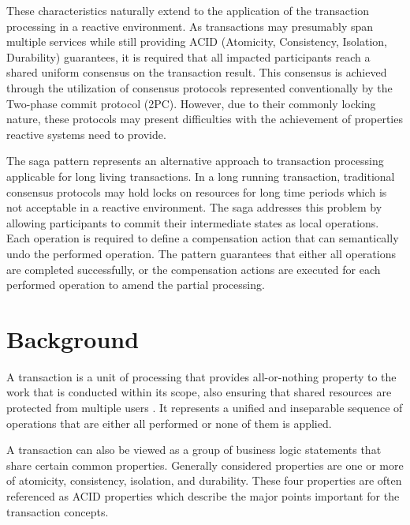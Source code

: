 \documentclass[5p]{elsarticle}
\begin{document}
These characteristics naturally extend to the application of the transaction processing in a reactive environment. As transactions may presumably span multiple services while still providing ACID (Atomicity, Consistency, Isolation, Durability) guarantees, it is required that all impacted participants reach a shared uniform consensus on the transaction result. This consensus is achieved through the utilization of consensus protocols represented conventionally by the Two-phase commit protocol (2PC). However, due to their commonly locking nature, these protocols may present difficulties with the achievement of properties reactive systems need to provide.

The saga pattern \cite{sagas_publ} represents an alternative approach to transaction processing applicable for long living transactions. In a long running transaction, traditional consensus protocols may hold locks on resources for long time periods which is not acceptable in a reactive environment. The saga addresses this problem by allowing participants to commit their intermediate states as local operations. Each operation is required to define a compensation action that can semantically undo the performed operation. The pattern guarantees that either all operations are completed successfully, or the compensation actions are executed for each performed operation to amend the partial processing.

 
\section{Background}

A transaction is a unit of processing that provides all-or-nothing property to the work that is conducted within its scope, also ensuring that shared resources are protected from multiple users \cite{java_tran_processing}. It represents a unified and inseparable sequence of operations that are either all performed or none of them is applied. 

A transaction can also be viewed as a group of business logic statements that share certain common properties. Generally considered properties are one or more of atomicity, consistency, isolation, and durability. These four properties are often referenced as ACID properties \cite{haerder_reuter_1983} which describe the major points important for the transaction concepts.
 
\end{document}

